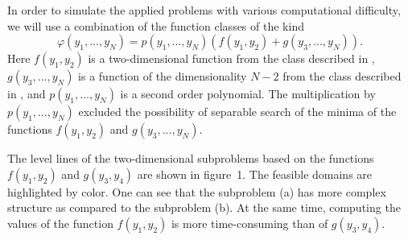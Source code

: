 \documentclass[a4paper]{jpconf}
\begin{document}
In order to simulate the applied problems with various computational 
difficulty, we will use a combination of the function classes of the kind 
\[
\varphi(y_1,...,y_N) = p(y_1,...,y_N)(f(y_1,y_2)+g(y_3,...,y_N)).
\]
Here $f(y_1,y_2)$ is a two-dimensional function from the class described in \cite{Gergel2016}, $g(y_3,...,y_N)$ is a function of the dimensionality $N-2$ from the 
class described in \cite{Sergeyev2015}, and $p(y_1,...,y_N)$ is a second 
order polynomial. The multiplication by $p(y_1,...,y_N)$ excluded the possibility of 
separable search of the minima of the functions $f(y_1,y_2)$ and 
$g(y_3,...,y_N)$. 

The level lines of the two-dimensional subproblems based on the functions 
$f(y_1,y_2)$ and $g(y_3,y_4)$ are shown in figure~1. The feasible domains are highlighted by color. One can see that 
the subproblem (a) has more complex structure as compared to the subproblem 
(b). At the same time, computing the values of the function $f(y_1,y_2)$ is 
more time-consuming than of $g(y_3,y_4)$.
\end{document}

